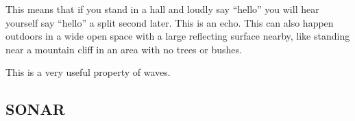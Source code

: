 This means that if you stand in a hall and loudly say ``hello'' you will hear yourself say ``hello'' a split second later. This is an echo. This can also happen outdoors in a wide open space with a large reflecting surface nearby, like standing near a mountain cliff in an area with no trees or bushes.

This is a very useful property of waves.

         \subsection*{SONAR}
            \nopagebreak
      \label{m38800*id185202}
\begin{minipage}{.5\textwidth}
      	\begin{figure}[H] %
    \begin{center}


\end{center}
\end{figure}
\end{minipage}

